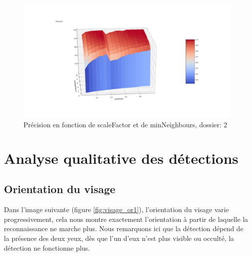 \documentclass[a4paper,11pt]{article}
\begin{document}
	        \begin{figure}[H]
	            \begin{center}
	        	\includegraphics[scale = 0.4]{images/courbes/precision_fine_scale_2_dossier_2.png}
	        	\caption{Précision en fonction de scaleFactor et de minNeighbours, dossier: 2}
	        	\label{fig:precision_fine_scale_2_dossier_2}
	            \end{center}
	        \end{figure}

\section{Analyse qualitative des détections}
    
    \subsection{Orientation du visage}
	
	Dans l'image suivante (figure \ref{fig:visage_or1}), l'orientation du visage varie
	progressivement, cela nous montre exactement l'orientation à partir de laquelle la
	reconnaissance ne marche plus. Nous remarquons ici que la détection dépend de la présence
	des deux yeux, dès que l'un d'eux n'est plus visible ou occulté, la détection ne fonctionne
	plus.
\end{document}
